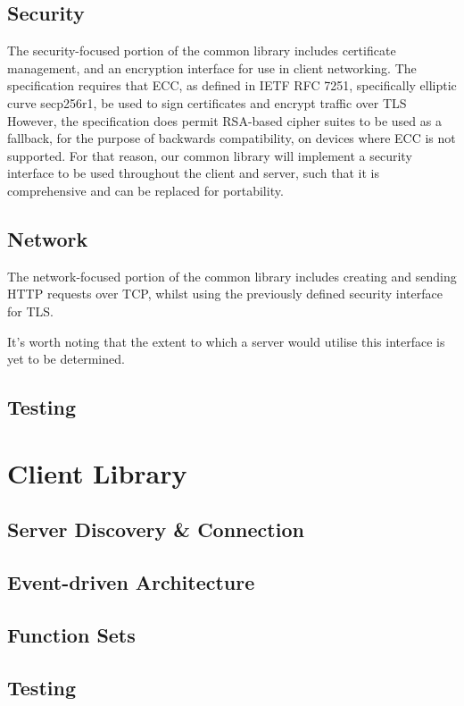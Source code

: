\subsection{Security}
The security-focused portion of the common library includes certificate management, and an encryption interface for use in client networking.
The specification requires that ECC, as defined in IETF RFC 7251, specifically elliptic curve secp256r1, be used to sign certificates and encrypt traffic over TLS 
However, the specification does permit RSA-based cipher suites to be used as a fallback, for the purpose of backwards compatibility, on devices where ECC is not supported.
For that reason, our common library will implement a security interface to be used throughout the client and server, such that it is comprehensive and can be replaced for portability.
\subsection{Network}
The network-focused portion of the common library includes creating and sending HTTP requests over TCP, whilst using the previously defined security interface for TLS.

It's worth noting that the extent to which a server would utilise this interface is yet to be determined.  


\subsection{Testing}



\section{Client Library}

\subsection{Server Discovery \& Connection}

\subsection{Event-driven Architecture}

\subsection{Function Sets}

\subsection{Testing}









